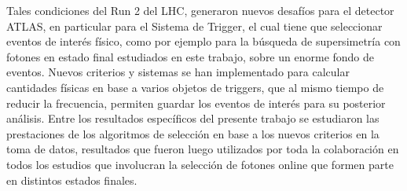 Tales condiciones del Run 2 del LHC, generaron nuevos desafíos para el detector ATLAS, en particular para el Sistema de Trigger, el cual tiene que seleccionar eventos de interés físico, como por ejemplo para la búsqueda de supersimetría con fotones en estado final estudiados en este trabajo, sobre un enorme fondo de eventos. Nuevos criterios y sistemas se han implementado para calcular cantidades físicas en base a varios objetos de triggers, que al mismo tiempo de reducir la frecuencia, permiten guardar los eventos de interés para su posterior análisis. Entre los resultados específicos del presente trabajo se estudiaron las prestaciones de los algoritmos de selección en base a los nuevos criterios en la toma de datos, resultados que fueron luego utilizados por toda la colaboración en todos los estudios que involucran la selección de fotones online que formen parte en distintos estados finales. 

